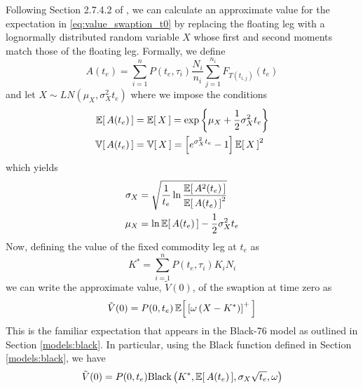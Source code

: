 Following Section 2.7.4.2 of \cite{Clark_2014}, we can calculate an approximate value for the expectation in \eqref{eq:value_swaption_t0} by replacing the floating leg with a lognormally distributed random variable $X$ whose first and second moments match those of the floating leg. Formally, we define
\begin{equation}
A(t_e) = \sum_{i=1}^{n} P(t_e, \tau_i) \frac{N_i}{n_i} \sum_{j=1}^{n_i} F_{T(t_{i,j})}(t_e)
\end{equation}
and let $X \sim LN(\mu_X, \sigma^2_X t_e)$ where we impose the conditions
\begingroup
\addtolength{\jot}{0.5em}
\begin{align}
\Ex{A(t_e)} &= \Ex{X} = \exp \left\{ \mu_X + \frac{1}{2} \sigma^2_X t_e \right\} \\
\Var{A(t_e)} &= \Var{X} = \left[ e^{\sigma^2_X t_e} - 1 \right] \Ex{X}^2
\end{align}
\endgroup
which yields
\begingroup
\addtolength{\jot}{0.5em}
\begin{align}
\sigma_X &= \sqrt{ \frac{1}{t_e} \ln \frac{\Ex{A^2(t_e)}}{\Ex{A(t_e)}^2} } \label{eq:future_sigma_x} \\
\mu_X &= \ln \Ex{A(t_e)} - \frac{1}{2} \sigma^2_X t_e \label{eq:future_mu_x}
\end{align}
\endgroup
Now, defining the value of the fixed commodity leg at $t_e$ as
\begin{equation}
K^{*} = \sum_{i=1}^{n} P(t_e, \tau_i) K_i N_i
\end{equation}
we can write the approximate value, $\tilde{V}(0)$, of the swaption at time zero as
\begin{equation}
\tilde{V}(0) = P(0, t_e) \Ex{\left[ \omega \left( X - K^{*} \right) \right]^{+}}
\end{equation}
This is the familiar expectation that appears in the Black-76 model as outlined in Section \ref{models:black}. In particular, using the $\text{Black}$ function defined in Section \ref{models:black}, we have
\begin{equation}
\tilde{V}(0) = P(0, t_e) \text{Black} \left( K^{*}, \Ex{A(t_e)}, \sigma_X \sqrt{t_e}, \omega \right)
\end{equation}


